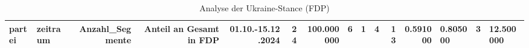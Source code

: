 \begin{table}
\caption{Analyse der Ukraine-Stance (FDP)}
\label{tab:meine_tabelle}
\begin{tabular}{llrrrrrrrrrr}
\toprule
partei & zeitraum & Anzahl_Segmente & Anteil an Gesamt in %
\midrule
FDP & 01.10.-15.12.2024 & 24 & 100.000000 & 6 & 1 & 4 & 13 & 0.591000 & 0.805000 & 3 & 12.500000 \\
\bottomrule
\end{tabular}
\end{table}
